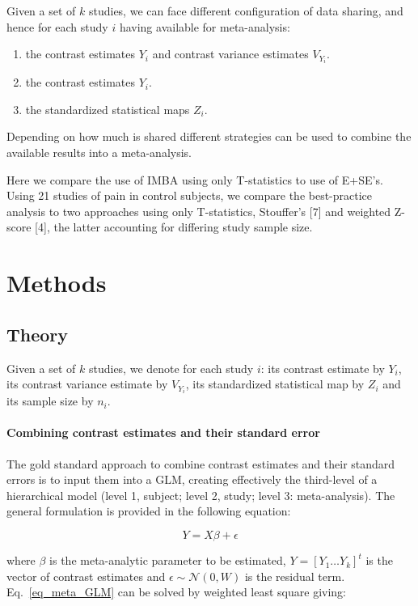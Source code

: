 \documentclass{llncs}
\newcommand{\effectvector}{Y}
\newcommand{\effect}[1][i]{\effectvector_{#1}}
\newcommand{\vareffect}[1][i]{V_{\effect[#1]}}
\newcommand{\zeffect}[1][i]{Z_{#1}}
\newcommand{\nStudies}{k}
\begin{document}
Given a set of $k$ studies, we can face different configuration of data sharing, and hence for each study $i$ having available for meta-analysis:
\begin{enumerate}
	\item the contrast estimates $\effect$ and contrast variance estimates $\vareffect$.
	\item the contrast estimates $\effect$.	
	\item the standardized statistical maps $\zeffect$.		
\end{enumerate}

Depending on how much is shared different strategies can be used to combine the available results into a meta-analysis.

Here we compare the use of IMBA using only T-statistics to use of E+SE's. Using 21 studies of pain in control subjects, we compare the best-practice analysis to two approaches using only T-statistics, Stouffer's [7] and weighted Z-score [4], the latter accounting for differing study sample size.

\section{Methods}
\subsection{Theory}
Given a set of $k$ studies, we denote for each study $i$: its contrast estimate by $\effect$, its contrast variance estimate by $\vareffect$, its standardized statistical map by $\zeffect$ and its sample size by $n_i$.		

\paragraph{Combining contrast estimates and their standard error}

The gold standard approach to combine contrast estimates and their standard errors is to input them into a GLM, creating effectively the third-level of a hierarchical model (level 1, subject; level 2, study; level 3: meta-analysis). The general formulation is provided in the following equation:

\begin{equation}
	\effectvector = X \beta + \epsilon
	\label{eq_meta_GLM}
\end{equation}

where $\beta$ is the meta-analytic parameter to be estimated, $Y = [\effect[1] \ldots \effect[\nStudies] ]^t$ is the vector of contrast estimates and $\epsilon \sim \mathcal{N}(0,W)$ is the residual term. Eq.~\eqref{eq_meta_GLM} can be solved by weighted least square giving:
\end{document}
